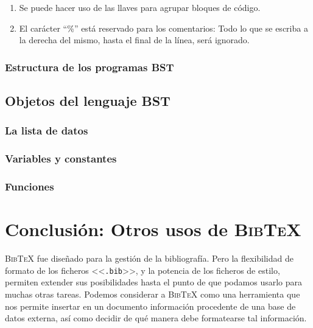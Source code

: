 \documentclass[a4paper,11pt]{article}
\def\btx-{\textsc{Bib\TeX}}
\def\ltr#1-{<<\texttt{#1}>>}
\def\tpf#1-{\ltr.#1-}
\begin{document}
\begin{enumerate}
\item Se puede hacer uso de las llaves para agrupar bloques de código.

\item El carácter  ``\%'' está reservado para los comentarios:  Todo lo que se
  escriba a la derecha del mismo, hasta el final de la línea, será ignorado.

\end{enumerate}

\subsubsection{Estructura de los programas BST}
\label{sec:estructura-de-un}

\subsection{Objetos del lenguaje BST}
\label{sec:sintaxis-de-los}

\subsubsection{La lista de datos}
\label{sec:la-lista-de-2}

\subsubsection{Variables y constantes}
\label{sec:almac-de-los}

\subsubsection{Funciones}
\label{sec:funciones}

\section{Conclusión: Otros usos de \btx-}
\label{sec:otros-usos-de}

\btx- fue diseñado para la gestión de la bibliografía. Pero la flexibilidad de
formato de  los ficheros \tpf bib-, y  la potencia de los  ficheros de estilo,
permiten extender sus posibilidades hasta  el punto de que podamos usarlo para
muchas otras tareas.  Podemos considerar  a \btx- como una herramienta que nos
permite insertar en  un documento información procedente de  una base de datos
externa, así como decidir de qué manera debe formatearse tal información.
\end{document}

